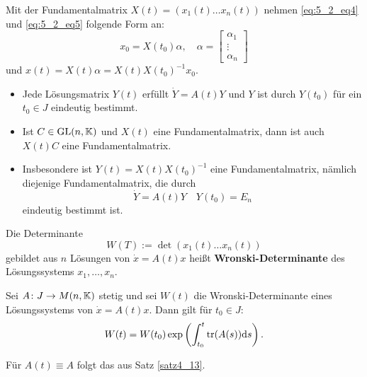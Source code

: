 Mit der Fundamentalmatrix $X(t) = (x_1(t) \dots x_n(t))$ nehmen \eqref{eq:5_2_eq4} und \eqref{eq:5_2_eq5} folgende Form an:
\[x_0 = X(t_0) \alpha, \quad \alpha = \begin{bmatrix}
	\alpha_1\\\vdots\\\alpha_n
\end{bmatrix}\]
und $x(t) = X(t) \alpha = X(t) X(t_0)^{-1} x_0$.
\begin{itemize}
	\item Jede Lösungsmatrix $Y(t)$ erfüllt $\dot{Y} = A(t) Y$ und $Y$ ist durch $Y(t_0)$ für ein $t_0 \in J$ eindeutig bestimmt.
	\item Ist $C \in \mathrm{GL}(n,\mathbb{K})$ und $X(t)$ eine Fundamentalmatrix, dann ist auch $X(t)C$ eine Fundamentalmatrix.
	\item Insbesondere ist $Y(t) = X(t) X(t_0)^{-1}$ eine Fundamentalmatrix, nämlich diejenige Fundamentalmatrix, die durch
	\[\dot{Y} = A(t) Y \quad Y(t_0) = E_n\]
	eindeutig bestimmt ist. 
\end{itemize}
Die Determinante
\[W(T) := \det(x_1(t) \dots x_n(t))\]
gebildet aus $n$ Lösungen von $\dot{x} = A(t) x$ heißt \textbf{Wronski-Determinante} des Lösungssystems $x_1, \dots, x_n$.
\begin{satz}\label{satz5_4}
	Sei $A \colon J \to M(n,\mathbb{K})$ stetig und sei $W(t)$ die Wronski-Determinante eines Lösungssystems von $\dot{x} = A(t) x$. Dann gilt für $t_0 \in J$:
	\[W(t) = W(t_0) \exp\left(\int_{t_0}^{t} \mathrm{tr}(A(s)) \mathrm{d} s\right).\]
\end{satz}
\begin{rem}
	Für $A(t) \equiv A$ folgt das aus Satz \ref{satz4_13}.
\end{rem}

